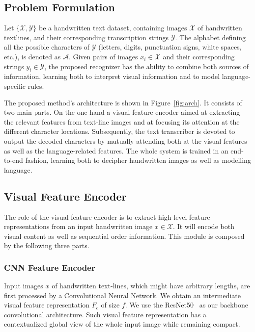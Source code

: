 \documentclass[10pt,twocolumn,letterpaper]{article}
\begin{document}
\subsection{Problem Formulation}
Let $\{\mathcal{X}, \mathcal{Y}\}$ be a handwritten text dataset, containing images $\mathcal{X}$ of handwritten textlines, and their corresponding transcription strings $\mathcal{Y}$. The alphabet defining all the possible characters of $\mathcal{Y}$ (letters, digits, punctuation signs, white spaces, etc.), is denoted as $\mathcal{A}$. Given pairs of images $x_i \in \mathcal{X}$ and their corresponding strings $y_i \in \mathcal{Y}$, the proposed recognizer has the ability to combine both sources of information, learning both to interpret visual information and to model language-specific rules. 

The proposed method's architecture is shown in Figure~\ref{fig:arch}. It consists of two main parts. On the one hand a visual feature encoder aimed at extracting the relevant features from text-line images and at focusing its attention at the different character locations. Subsequently, the text transcriber is devoted to output the decoded characters by mutually attending both at the visual features as well as the language-related features. The whole system is trained in an end-to-end fashion, learning both to decipher handwritten images as well as modelling language. 





\subsection{Visual Feature Encoder}
The role of the visual feature encoder is to extract high-level feature representations from an input handwritten image $x\in\mathcal{X}$. It will encode both visual content as well as sequential order information. This module is composed by the following three parts.

\subsubsection{CNN Feature Encoder}
\label{sec:cnn}
Input images $x$ of handwritten text-lines, which might have arbitrary lengths, are first processed by a Convolutional Neural Network. We obtain an intermediate visual feature representation $F_{c}$ of size $f$.  We use the ResNet50~\cite{he2016deep} as our backbone convolutional architecture. Such visual feature representation has a contextualized global view of the whole input image while remaining compact.
\end{document}

